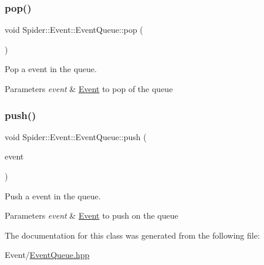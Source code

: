 \subsubsection{\texorpdfstring{pop()}{pop()}}
{\footnotesize\ttfamily void Spider\+::\+Event\+::\+Event\+Queue\+::pop (\begin{DoxyParamCaption}{ }\end{DoxyParamCaption})}



Pop a event in the queue. 


\begin{DoxyParams}{Parameters}
{\em event} & \hyperlink{namespace_spider_1_1_event}{Event} to pop of the queue \\
\hline
\end{DoxyParams}
\mbox{\label{class_spider_1_1_event_1_1_event_queue_a978f4bd1835a93fccee1d8b04a547509}} 
\subsubsection{\texorpdfstring{push()}{push()}}
{\footnotesize\ttfamily void Spider\+::\+Event\+::\+Event\+Queue\+::push (\begin{DoxyParamCaption}\item[{\hyperlink{class_spider_1_1_event_1_1_i_event}{I\+Event} $\ast$}]{event }\end{DoxyParamCaption})}



Push a event in the queue. 


\begin{DoxyParams}{Parameters}
{\em event} & \hyperlink{namespace_spider_1_1_event}{Event} to push on the queue \\
\hline
\end{DoxyParams}


The documentation for this class was generated from the following file\+:\begin{DoxyCompactItemize}
\item 
Event/\hyperlink{_event_queue_8hpp}{Event\+Queue.\+hpp}\end{DoxyCompactItemize}
